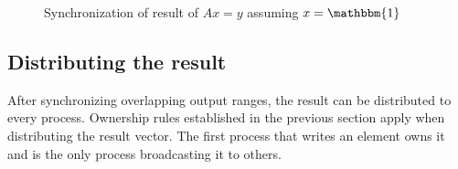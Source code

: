 \documentclass[thesis=M,english]{FITthesis}[2019/12/23]
\begin{document}
\begin{figure}[htp]
    \caption{Synchronization of result of \(Ax = y\) assuming \(x=\mathbbm{1}\)}
\end{figure}


\subsection{Distributing the result}\label{dspmv:dist}

After synchronizing overlapping output ranges, the result can be distributed to every process.
Ownership rules established in the previous section apply when distributing the result vector.
The first process that writes an element owns it and is the only process broadcasting it to
others.
\end{document}
